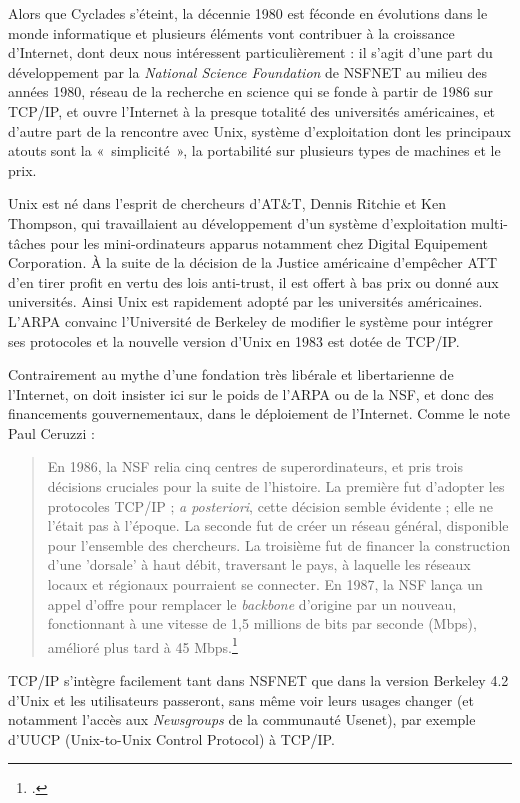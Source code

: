 \documentclass{FramateX}
\begin{document}
\begin{refsection}
Alors que Cyclades s'éteint, la décennie 1980 est
féconde en évolutions dans le monde informatique et plusieurs éléments vont contribuer à la croissance d'Internet, dont deux
nous intéressent particulièrement : il s'agit
d'une part du développement par la \textit{National
Science Foundation} de NSFNET au milieu des années 1980, réseau de la recherche en science qui se fonde à partir de 1986 sur TCP/IP, et ouvre
l'Internet à la presque totalité des universités
américaines, et d'autre part de la rencontre avec
Unix, système d'exploitation dont les principaux
atouts sont la «~simplicité~», la portabilité sur plusieurs types de machines et le prix. 

Unix est né dans l'esprit de chercheurs
d'AT\&T, Dennis Ritchie et Ken Thompson, qui
travaillaient au développement d'un système
d'exploitation multi-tâches pour les mini-ordinateurs
apparus notamment chez Digital Equipement Corporation. À la
suite de la décision de la Justice américaine
d'empêcher ATT d'en tirer profit en
vertu des lois anti-trust, il est offert à bas prix ou donné aux
universités. Ainsi Unix est rapidement adopté par les universités
américaines. L'ARPA convainc
l'Université de Berkeley de modifier le système pour
intégrer ses protocoles et la nouvelle version d'Unix
en 1983 est dotée de TCP/IP.

Contrairement au mythe d'une fondation très libérale et
libertarienne de l'Internet, on doit insister ici sur
le poids de l'ARPA ou de la NSF, et donc des
financements gouvernementaux, dans le déploiement de
l'Internet. Comme le note Paul Ceruzzi : 

\begin{quote}
En 1986, la NSF relia cinq centres de superordinateurs, et pris trois
décisions cruciales pour la suite de l'histoire. La
première fut d'adopter les protocoles TCP/IP ;
\textit{a posteriori}, cette décision semble évidente ; elle ne
l'était pas à l'époque. La seconde
fut de créer un réseau général, disponible pour
l'ensemble des chercheurs. La troisième fut de
financer la construction d'une
'dorsale' à haut débit, traversant le
pays, à laquelle les réseaux locaux et régionaux pourraient se
connecter. En 1987, la NSF lança un appel d'offre pour
remplacer le \textit{backbone} d'origine par un
nouveau, fonctionnant à une vitesse de 1,5 millions de bits par seconde
(Mbps), amélioré plus tard à 45
Mbps.\footnote{\cite{ceruzziaux2012}.}
\end{quote}

TCP/IP s'intègre facilement tant dans NSFNET que dans
la version Berkeley 4.2 d'Unix et les utilisateurs
passeront, sans même voir leurs usages changer (et notamment
l'accès aux \textit{Newsgroups} de la communauté
Usenet), par exemple d'UUCP (Unix-to-Unix Control Protocol) à TCP/IP. 


\end{refsection}
\end{document}

